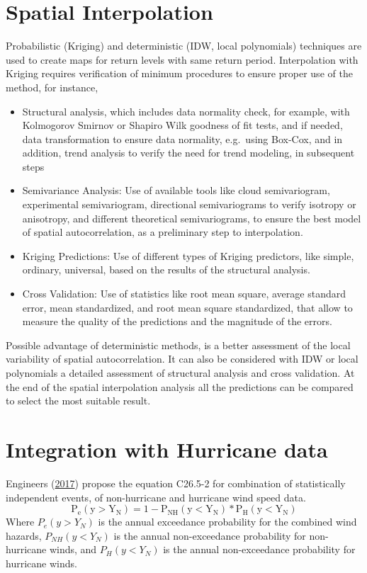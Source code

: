 \documentclass[12pt,oneside]{reedthesis}
\begin{document}
\hypertarget{si}{%
\section{Spatial Interpolation}\label{si}}

Probabilistic (Kriging) and deterministic (IDW, local polynomials) techniques are used to create maps for return levels with same return period. Interpolation with Kriging requires verification of minimum procedures to ensure proper use of the method, for instance,
\begin{itemize}
\item
  Structural analysis, which includes data normality check, for example, with Kolmogorov Smirnov or Shapiro Wilk goodness of fit tests, and if needed, data transformation to ensure data normality, e.g.~using Box-Cox, and in addition, trend analysis to verify the need for trend modeling, in subsequent steps
\item
  Semivariance Analysis: Use of available tools like cloud semivariogram, experimental semivariogram, directional semivariograms to verify isotropy or anisotropy, and different theoretical semivariograms, to ensure the best model of spatial autocorrelation, as a preliminary step to interpolation.
\item
  Kriging Predictions: Use of different types of Kriging predictors, like simple, ordinary, universal, based on the results of the structural analysis.
\item
  Cross Validation: Use of statistics like root mean square, average standard error, mean standardized, and root mean square standardized, that allow to measure the quality of the predictions and the magnitude of the errors.
\end{itemize}
Possible advantage of deterministic methods, is a better assessment of the local variability of spatial autocorrelation. It can also be considered with IDW or local polynomials a detailed assessment of structural analysis and cross validation. At the end of the spatial interpolation analysis all the predictions can be compared to select the most suitable result.

\hypertarget{integration}{%
\section{Integration with Hurricane data}\label{integration}}

Engineers (\protect\hyperlink{ref-Asce2017}{2017}) propose the equation C26.5-2 for combination of statistically independent events, of non-hurricane and hurricane wind speed data.
\begin{equation}
  \mathrm{
          P_e(y>Y_N) = 1 - P_{NH}(y<Y_N)*P_{H}(y<Y_N)
        }
  \label{eq:combination}
\end{equation}
Where \(P_e(y>Y_N)\) is the annual exceedance probability for the combined wind hazards, \(P_{NH}(y<Y_N)\) is the annual non-exceedance probability for non-hurricane winds, and \(P_{H}(y<Y_N)\) is the annual non-exceedance probability for hurricane winds.
\end{document}
